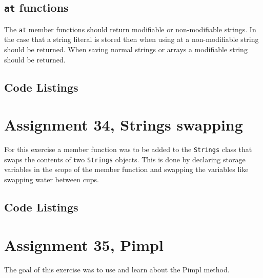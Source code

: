 \documentclass[11pt]{article}
\begin{document}
\subsection*{\texttt{at} functions}
The \texttt{at} member functions should return modifiable or non-modifiable strings. In the case that a string literal is stored then when using at a non-modifiable string should be returned. When saving normal strings or arrays a modifiable string should be returned.

\subsection*{Code Listings}













\section*{Assignment 34, Strings swapping}
For this exercise a member function was to be added to the \texttt{Strings} class that swaps the contents of two \texttt{Strings} objects. This is done by declaring storage variables in the scope of the member function and swapping the variables like swapping water between cups.

\subsection*{Code Listings}



\section*{Assignment 35, Pimpl}
The goal of this exercise was to use and learn about the Pimpl method.
\end{document}
